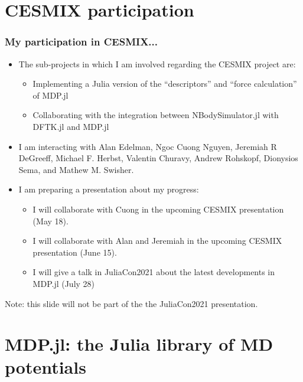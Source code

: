 \documentclass[10pt]{beamer}
\theoremstyle{remark}
\theoremstyle{definition}
\begin{document}
 


\section{CESMIX participation}

\begin{frame}
\frametitle{My participation in CESMIX...}

\small

\begin{itemize}

\item The sub-projects in which I am involved regarding the CESMIX project are:
	\begin{itemize}
	\item Implementing a Julia version of the “descriptors” and “force calculation” of MDP.jl
	\item Collaborating with the integration between NBodySimulator.jl with DFTK.jl and MDP.jl
	\end{itemize}
\item I am interacting with Alan Edelman, Ngoc Cuong Nguyen, Jeremiah R DeGreeff, Michael F. Herbst, Valentin Churavy, Andrew Rohskopf, Dionysios Sema, and Mathew M. Swisher.
\item I am preparing a presentation about my progress:
	\begin{itemize}
	\item I will collaborate with Cuong in the upcoming CESMIX presentation (May 18).
	\item I will collaborate with Alan and Jeremiah in the upcoming CESMIX presentation (June 15).
	\item I will give a talk in JuliaCon2021 about the latest developments in MDP.jl (July 28)
	\end{itemize}

\end{itemize}

Note: this slide will not be part of the the JuliaCon2021 presentation.
	
\end{frame}






\section{MDP.jl: the Julia library of MD potentials}
\end{document}
